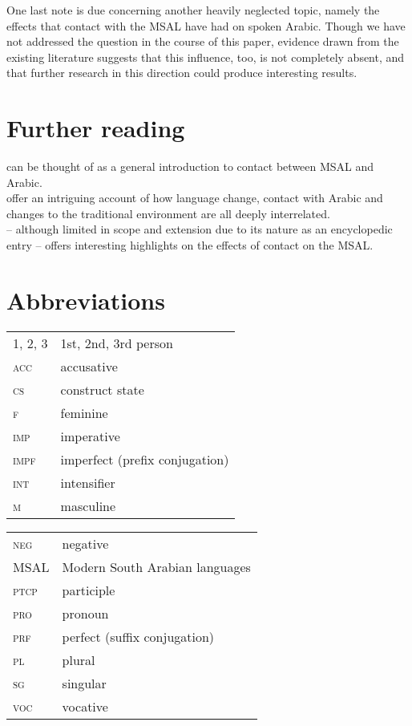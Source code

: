 \documentclass[output=paper]{langsci/langscibook}
\begin{document}
One last note is due concerning another heavily neglected topic, namely the effects that contact with the MSAL have had on spoken Arabic. Though we have not addressed the question in the course of this paper, evidence drawn from the existing literature \citep{Simeone-Senelle2002} suggests that this influence, too, is not completely absent, and that further research in this direction could produce interesting results. 

\section*{Further reading}

 \citet{Morris2017} can be thought of as a general introduction to contact between MSAL and Arabic. \\
 \citet{WatsonAl-Mahri2017} offer an intriguing account of how language change, contact with Arabic and changes to the traditional environment are all deeply interrelated. \\ \citet{Lonnet2011} – although limited in scope and extension due to its nature as an encyclopedic entry – offers interesting highlights on the effects of contact on the MSAL.
 
 
\section*{Abbreviations}

\begin{tabularx}{.5\textwidth}{@{}lQ@{}}
\textsc{1, 2, 3} & 1st, 2nd, 3rd person \\
\textsc{acc} & accusative \\
\textsc{cs} & construct state \\
\textsc{f} & feminine \\
\textsc{imp} & imperative \\
\textsc{impf} & imperfect (prefix conjugation) \\
\textsc{int} & intensifier \\
\textsc{m} & masculine \\
\end{tabularx}%
\begin{tabularx}{.5\textwidth}{@{}lQ@{}}
\textsc{neg} & negative \\
MSAL & Modern South Arabian languages \\
\textsc{ptcp} & participle \\
\textsc{pro} & pronoun \\
\textsc{prf} & perfect (suffix conjugation) \\
\textsc{pl} & plural \\
\textsc{sg} & singular \\
\textsc{voc} & vocative \\
\end{tabularx}%


\sloppy
\printbibliography[heading=subbibliography,notkeyword=this]
\end{document}
